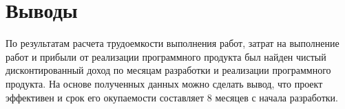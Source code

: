 \section{Выводы}

По результатам расчета трудоемкости выполнения работ, затрат на выполнение работ и прибыли от реализации программного продукта был найден чистый дисконтированный доход по месяцам разработки и реализации программного продукта. На основе полученных данных можно сделать вывод, что проект эффективен и срок его окупаемости составляет 8 месяцев с начала разработки.